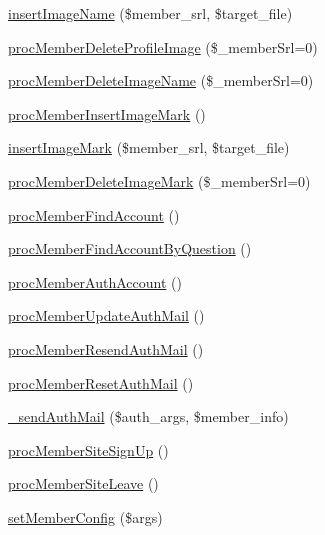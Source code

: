 \begin{DoxyCompactItemize}
\item 
\hyperlink{classmemberController_a723651429eec4409cc58daefb508e7bf}{insert\+Image\+Name} (\$member\+\_\+srl, \$target\+\_\+file)
\item 
\hyperlink{classmemberController_a469c2f84ff27c0fb9fc9ae7f3b921548}{proc\+Member\+Delete\+Profile\+Image} (\$\+\_\+member\+Srl=0)
\item 
\hyperlink{classmemberController_a5b2d6f21719829dcf1b422e9958bcf48}{proc\+Member\+Delete\+Image\+Name} (\$\+\_\+member\+Srl=0)
\item 
\hyperlink{classmemberController_afcb874e178e1c13158e364b891998640}{proc\+Member\+Insert\+Image\+Mark} ()
\item 
\hyperlink{classmemberController_a99efb504d3ab31a6365434696cb7b2fb}{insert\+Image\+Mark} (\$member\+\_\+srl, \$target\+\_\+file)
\item 
\hyperlink{classmemberController_a22dff50295755ba06fb55d60104dbb32}{proc\+Member\+Delete\+Image\+Mark} (\$\+\_\+member\+Srl=0)
\item 
\hyperlink{classmemberController_a6ba64b98fa5d0fd55435e464f02d050e}{proc\+Member\+Find\+Account} ()
\item 
\hyperlink{classmemberController_a1141d3b40fc5927dcbaff3b4b4b11bff}{proc\+Member\+Find\+Account\+By\+Question} ()
\item 
\hyperlink{classmemberController_a2dfdfbe05e0248b65c9aadf969195c12}{proc\+Member\+Auth\+Account} ()
\item 
\hyperlink{classmemberController_a9c41ccfb32ecb9c77a1c4f849dc7d38b}{proc\+Member\+Update\+Auth\+Mail} ()
\item 
\hyperlink{classmemberController_aa0e4416a4e98fc31701ba68581b7c14b}{proc\+Member\+Resend\+Auth\+Mail} ()
\item 
\hyperlink{classmemberController_ab0515bd2aae55dbda2049d39612ef6b2}{proc\+Member\+Reset\+Auth\+Mail} ()
\item 
\hyperlink{classmemberController_a8768cc1066bf70222fdd0f0fa2d55d31}{\+\_\+send\+Auth\+Mail} (\$auth\+\_\+args, \$member\+\_\+info)
\item 
\hyperlink{classmemberController_a4dfc326f5bc6d97b86b919c568457000}{proc\+Member\+Site\+Sign\+Up} ()
\item 
\hyperlink{classmemberController_a46240bb8dbfcff52844ce8387076ca61}{proc\+Member\+Site\+Leave} ()
\item 
\hyperlink{classmemberController_a842fafd2abf22d779591486124003d92}{set\+Member\+Config} (\$args)
\item 

\end{DoxyCompactItemize}
